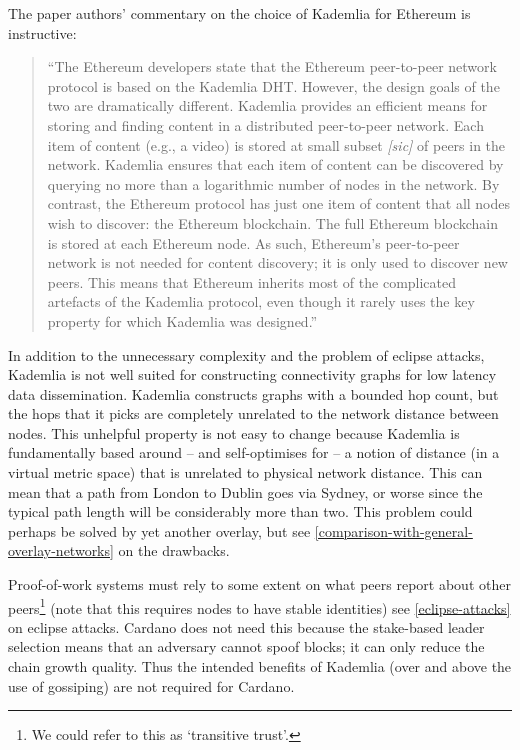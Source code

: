 \documentclass[11pt,a4paper]{article}
\begin{document}
The paper authors' commentary on the choice of Kademlia for Ethereum is
instructive:

\begin{quote}
``The Ethereum developers state that the Ethereum peer-to-peer network
protocol is based on the Kademlia DHT. However, the design goals of the
two are dramatically different. Kademlia provides an efficient means for
storing and finding content in a distributed peer-to-peer network. Each
item of content (e.g., a video) is stored at small subset
\emph{{[}sic{]}} of peers in the network. Kademlia ensures that each
item of content can be discovered by querying no more than a logarithmic
number of nodes in the network. By contrast, the Ethereum protocol has
just one item of content that all nodes wish to discover: the Ethereum
blockchain. The full Ethereum blockchain is stored at each Ethereum
node. As such, Ethereum's peer-to-peer network is not needed for content
discovery; it is only used to discover new peers. This means that
Ethereum inherits most of the complicated artefacts of the Kademlia
protocol, even though it rarely uses the key property for which Kademlia
was designed.''
\end{quote}

In addition to the unnecessary complexity and the problem of eclipse
attacks, Kademlia is not well suited for constructing connectivity
graphs for low latency data dissemination. Kademlia constructs graphs
with a bounded hop count, but the hops that it picks are completely
unrelated to the network distance between nodes. This unhelpful property
is not easy to change because Kademlia is fundamentally based around --
and self-optimises for -- a notion of distance (in a virtual metric
space) that is unrelated to physical network distance. This can mean
that a path from London to Dublin goes via Sydney, or worse since the
typical path length will be considerably more than two. This problem
could perhaps be solved by yet another overlay, but see
\cref{comparison-with-general-overlay-networks} on the drawbacks.

Proof-of-work systems must rely to some extent on what peers report
about other peers\footnote{We could refer to this as `transitive trust'.}
(note that this requires nodes to have stable identities) see
\cref{eclipse-attacks} on eclipse attacks.
Cardano does not need this because the stake-based leader selection
means that an adversary cannot spoof blocks; it can only reduce the
chain growth quality. Thus the intended benefits of Kademlia (over and
above the use of gossiping) are not required for Cardano.
\end{document}
